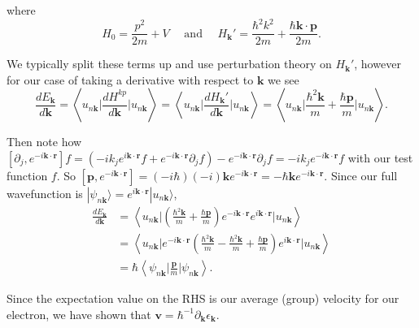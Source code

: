 \documentclass[12pt]{revtex4-2}
\begin{document}
where
\begin{equation}
    H_0 = \frac{p^2}{2m} + V \quad \text{ and } \quad H_\mathbf{k}' = \frac{\hbar^2 k^2}{2m} + \frac{\hbar \mathbf{k}\cdot\mathbf{p}}{2m}.
\end{equation}

We typically split these terms up and use perturbation theory on $H_\mathbf{k}'$, however for our case of taking a derivative with respect to $\mathbf{k}$ we see
\begin{equation}
    \frac{dE_\mathbf{k}}{d\mathbf{k}} = \left\langle u_{n\mathbf{k}} \bigg| \frac{d H^{kp}}{d\mathbf{k}} \bigg| u_{n\mathbf{k}} \right\rangle = \left\langle u_{n\mathbf{k}} \bigg| \frac{d H_\mathbf{k}'}{d\mathbf{k}} \bigg| u_{n\mathbf{k}} \right\rangle = \left\langle u_{n\mathbf{k}} \bigg| \frac{\hbar^2 \mathbf{k}}{m} + \frac{\hbar\mathbf{p}}{m} \bigg| u_{n\mathbf{k}} \right\rangle.
\end{equation}

Then note how $[\partial_j,e^{-i\mathbf{k}\cdot\mathbf{r}}]f = (-ik_je^{i\mathbf{k}\cdot\mathbf{r}}f + e^{-i\mathbf{k}\cdot\mathbf{r}}\partial_j f) - e^{-i\mathbf{k}\cdot\mathbf{r}}\partial_j f = -ik_je^{-i\mathbf{k}\cdot\mathbf{r}}f$ with our test function $f$.  So $[\mathbf{p},e^{-i\mathbf{k}\cdot\mathbf{r}}] = (-i\hbar)(-i)\mathbf{k}e^{-i\mathbf{k}\cdot\mathbf{r}} = -\hbar\mathbf{k}e^{-i\mathbf{k}\cdot\mathbf{r}}$.  Since our full wavefunction is $|\psi_{n\mathbf{k}}\rangle = e^{i\mathbf{k}\cdot\mathbf{r}}|u_{n\mathbf{k}}\rangle$,
\begin{align}
    \frac{dE_\mathbf{k}}{d\mathbf{k}} &= \left\langle u_{n\mathbf{k}} \bigg| \left(\frac{\hbar^2 \mathbf{k}}{m} + \frac{\hbar\mathbf{p}}{m}\right) e^{-i\mathbf{k}\cdot\mathbf{r}}e^{i\mathbf{k}\cdot\mathbf{r}} \bigg| u_{n\mathbf{k}} \right\rangle \\
    &= \left\langle u_{n\mathbf{k}} \bigg|e^{-i\mathbf{k}\cdot\mathbf{r}} \left(\frac{\hbar^2 \mathbf{k}}{m} - \frac{\hbar^2 \mathbf{k}}{m} + \frac{\hbar\mathbf{p}}{m}\right) e^{i\mathbf{k}\cdot\mathbf{r}} \bigg| u_{n\mathbf{k}} \right\rangle \\
    &= \hbar\left\langle \psi_{n\mathbf{k}} \bigg| \frac{\mathbf{p}}{m} \bigg| \psi_{n\mathbf{k}} \right\rangle.
\end{align}

Since the expectation value on the RHS is our average (group) velocity for our electron, we have shown that $\mathbf{v} = \hbar^{-1}\partial_\mathbf{k}\epsilon_\mathbf{k}$.
\end{document}
